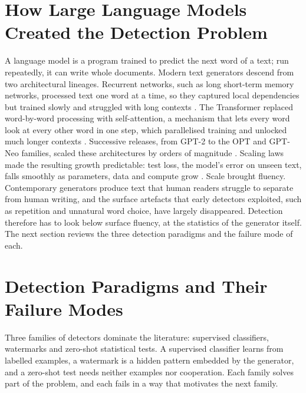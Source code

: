 \documentclass[logo,msc,cs]{infthesis}      %
\begin{document}
\section{How Large Language Models Created the Detection Problem}
\label{sec:llm_evolution}
A language model is a program trained to predict the next word of a text; run repeatedly, it can write whole documents. Modern text generators descend from two architectural lineages. Recurrent networks, such as long short-term memory networks, processed text one word at a time, so they captured local dependencies but trained slowly and struggled with long contexts \citep{hochreiter1997long, vinyals2015neural}. The Transformer replaced word-by-word processing with self-attention, a mechanism that lets every word look at every other word in one step, which parallelised training and unlocked much longer contexts \citep{vaswani2017attention}. Successive releases, from GPT-2 to the OPT and GPT-Neo families, scaled these architectures by orders of magnitude \citep{radford2019language, zhang2022opt, black2021gpt}. Scaling laws made the resulting growth predictable: test loss, the model's error on unseen text, falls smoothly as parameters, data and compute grow \citep{kaplan2020scaling, hoffmann2022training}.
Scale brought fluency. Contemporary generators produce text that human readers struggle to separate from human writing, and the surface artefacts that early detectors exploited, such as repetition and unnatural word choice, have largely disappeared. Detection therefore has to look below surface fluency, at the statistics of the generator itself. The next section reviews the three detection paradigms and the failure mode of each.

\section{Detection Paradigms and Their Failure Modes}
\label{sec:detection_landscape}
Three families of detectors dominate the literature: supervised classifiers, watermarks and zero-shot statistical tests. A supervised classifier learns from labelled examples, a watermark is a hidden pattern embedded by the generator, and a zero-shot test needs neither examples nor cooperation. Each family solves part of the problem, and each fails in a way that motivates the next family.
\end{document}
